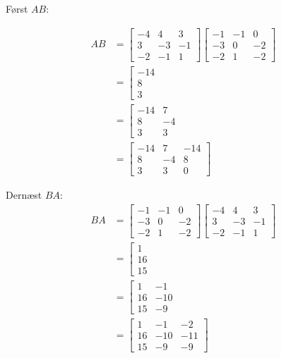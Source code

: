 \begin{solution}
    Først $AB$:

    \[
    \begin{aligned}
    A B &=\left[\begin{array}{rrr}
    -4 & 4 & 3 \\
    3 & -3 & -1 \\
    -2 & -1 & 1
    \end{array}\right]\left[\begin{array}{rrr}
    -1 & -1 & 0 \\
    -3 & 0 & -2 \\
    -2 & 1 & -2
    \end{array}\right] \\
    & =\left[\begin{array}{c}
    -14 \\
    8 \\
    3
    \end{array}\right. \\
    & =\left[\begin{array}{rr}
    -14 & 7 \\
    8 & -4 \\
    3 & 3
    \end{array}\right. \\
    & =\left[\begin{array}{rrr}
    -14 & 7 & -14 \\
    8 & -4 & 8 \\
    3 & 3 & 0
    \end{array}\right]
    \end{aligned}
    \]

    Dernæst $BA$:
    \[
    \begin{aligned}
    B A & =\left[\begin{array}{rrr}
    -1 & -1 & 0 \\
    -3 & 0 & -2 \\
    -2 & 1 & -2
    \end{array}\right]\left[\begin{array}{rrr}
    -4 & 4 & 3 \\
    3 & -3 & -1 \\
    -2 & -1 & 1
    \end{array}\right] \\
    & =\left[\begin{array}{rrr}
    1 \\
    16 & \\
    15
    \end{array}\right. \\
    & =\left[\begin{array}{rrr}
    1 & -1 \\
    16 & -10 \\
    15 & -9
    \end{array}\right. \\
    & =\left[\begin{array}{rrr}
    1 & -1 & -2 \\
    16 & -10 & -11 \\
    15 & -9 & -9
    \end{array}\right]
    \end{aligned}
    \]


\end{solution}
